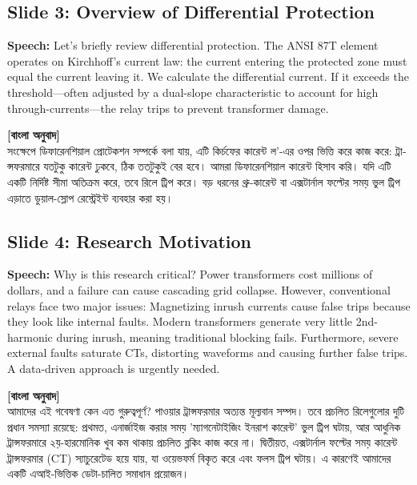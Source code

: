 \documentclass[12pt]{article}
\begin{document}
\subsection*{Slide 3: Overview of Differential Protection}
\textbf{Speech:} Let’s briefly review differential protection. The ANSI 87T element operates on Kirchhoff's current law: the current entering the protected zone must equal the current leaving it. We calculate the differential current. If it exceeds the threshold—often adjusted by a dual-slope characteristic to account for high through-currents—the relay trips to prevent transformer damage.

\begin{bengali}
\textbf{[বাংলা অনুবাদ]} \\
সংক্ষেপে ডিফারেনশিয়াল প্রোটেকশন সম্পর্কে বলা যায়, এটি কির্চফের কারেন্ট ল'-এর ওপর ভিত্তি করে কাজ করে: ট্রান্সফরমারে যতটুকু কারেন্ট ঢুকবে, ঠিক ততটুকুই বের হবে। আমরা ডিফারেনশিয়াল কারেন্ট হিসাব করি। যদি এটি একটি নির্দিষ্ট সীমা অতিক্রম করে, তবে রিলে ট্রিপ করে। বড় ধরনের থ্রু-কারেন্ট বা এক্সটার্নাল ফল্টের সময় ভুল ট্রিপ এড়াতে ডুয়াল-স্লোপ রেস্ট্রেইন্ট ব্যবহার করা হয়।
\end{bengali}

\subsection*{Slide 4: Research Motivation}
\textbf{Speech:} Why is this research critical? Power transformers cost millions of dollars, and a failure can cause cascading grid collapse. However, conventional relays face two major issues: Magnetizing inrush currents cause false trips because they look like internal faults. Modern transformers generate very little 2nd-harmonic during inrush, meaning traditional blocking fails. Furthermore, severe external faults saturate CTs, distorting waveforms and causing further false trips. A data-driven approach is urgently needed.

\begin{bengali}
\textbf{[বাংলা অনুবাদ]} \\
আমাদের এই গবেষণা কেন এত গুরুত্বপূর্ণ? পাওয়ার ট্রান্সফরমার অত্যন্ত মূল্যবান সম্পদ। তবে প্রচলিত রিলেগুলোর দুটি প্রধান সমস্যা রয়েছে: প্রথমত, এনার্জাইজ করার সময় 'ম্যাগনেটাইজিং ইনরাশ কারেন্ট' ভুল ট্রিপ ঘটায়, আর আধুনিক ট্রান্সফরমারে ২য়-হারমোনিক খুব কম থাকায় প্রচলিত ব্লকিং কাজ করে না। দ্বিতীয়ত, এক্সটার্নাল ফল্টের সময় কারেন্ট ট্রান্সফরমার (CT) স্যাচুরেটেড হয়ে যায়, যা ওয়েভফর্ম বিকৃত করে এবং ফলস ট্রিপ ঘটায়। এ কারণেই আমাদের একটি এআই-ভিত্তিক ডেটা-চালিত সমাধান প্রয়োজন।
\end{bengali}
\end{document}
